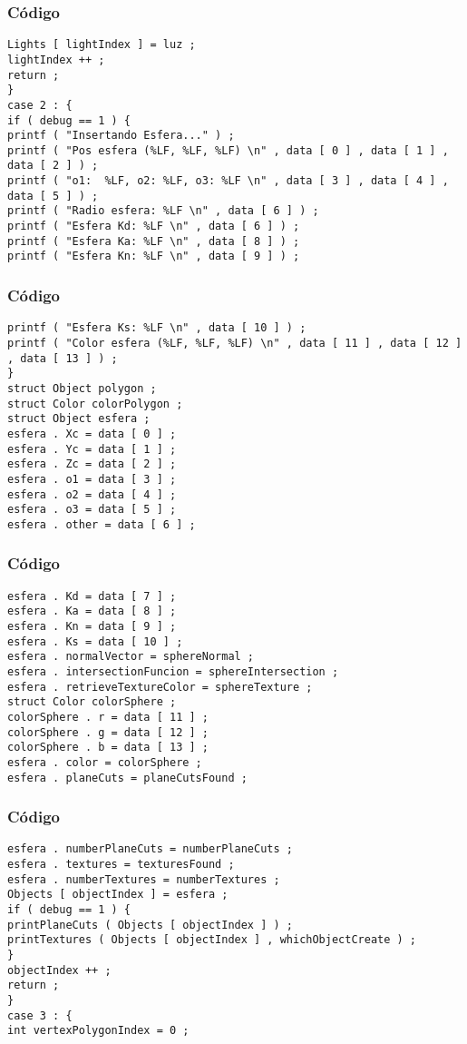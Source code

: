 \documentclass{beamer}
\begin{document}
\begin{frame}[fragile]
\frametitle{C\'odigo}
\begin{verbatim}
Lights [ lightIndex ] = luz ; 
lightIndex ++ ; 
return ; 
} 
case 2 : { 
if ( debug == 1 ) { 
printf ( "Insertando Esfera..." ) ; 
printf ( "Pos esfera (%LF, %LF, %LF) \n" , data [ 0 ] , data [ 1 ] , data [ 2 ] ) ; 
printf ( "o1:  %LF, o2: %LF, o3: %LF \n" , data [ 3 ] , data [ 4 ] , data [ 5 ] ) ; 
printf ( "Radio esfera: %LF \n" , data [ 6 ] ) ; 
printf ( "Esfera Kd: %LF \n" , data [ 6 ] ) ; 
printf ( "Esfera Ka: %LF \n" , data [ 8 ] ) ; 
printf ( "Esfera Kn: %LF \n" , data [ 9 ] ) ; 
\end{verbatim}
\end{frame}
\begin{frame}[fragile]
\frametitle{C\'odigo}
\begin{verbatim}
printf ( "Esfera Ks: %LF \n" , data [ 10 ] ) ; 
printf ( "Color esfera (%LF, %LF, %LF) \n" , data [ 11 ] , data [ 12 ] , data [ 13 ] ) ; 
} 
struct Object polygon ; 
struct Color colorPolygon ; 
struct Object esfera ; 
esfera . Xc = data [ 0 ] ; 
esfera . Yc = data [ 1 ] ; 
esfera . Zc = data [ 2 ] ; 
esfera . o1 = data [ 3 ] ; 
esfera . o2 = data [ 4 ] ; 
esfera . o3 = data [ 5 ] ; 
esfera . other = data [ 6 ] ; 
\end{verbatim}
\end{frame}
\begin{frame}[fragile]
\frametitle{C\'odigo}
\begin{verbatim}
esfera . Kd = data [ 7 ] ; 
esfera . Ka = data [ 8 ] ; 
esfera . Kn = data [ 9 ] ; 
esfera . Ks = data [ 10 ] ; 
esfera . normalVector = sphereNormal ; 
esfera . intersectionFuncion = sphereIntersection ; 
esfera . retrieveTextureColor = sphereTexture ; 
struct Color colorSphere ; 
colorSphere . r = data [ 11 ] ; 
colorSphere . g = data [ 12 ] ; 
colorSphere . b = data [ 13 ] ; 
esfera . color = colorSphere ; 
esfera . planeCuts = planeCutsFound ; 
\end{verbatim}
\end{frame}
\begin{frame}[fragile]
\frametitle{C\'odigo}
\begin{verbatim}
esfera . numberPlaneCuts = numberPlaneCuts ; 
esfera . textures = texturesFound ; 
esfera . numberTextures = numberTextures ; 
Objects [ objectIndex ] = esfera ; 
if ( debug == 1 ) { 
printPlaneCuts ( Objects [ objectIndex ] ) ; 
printTextures ( Objects [ objectIndex ] , whichObjectCreate ) ; 
} 
objectIndex ++ ; 
return ; 
} 
case 3 : { 
int vertexPolygonIndex = 0 ; 
\end{verbatim}
\end{frame}
\end{document}
